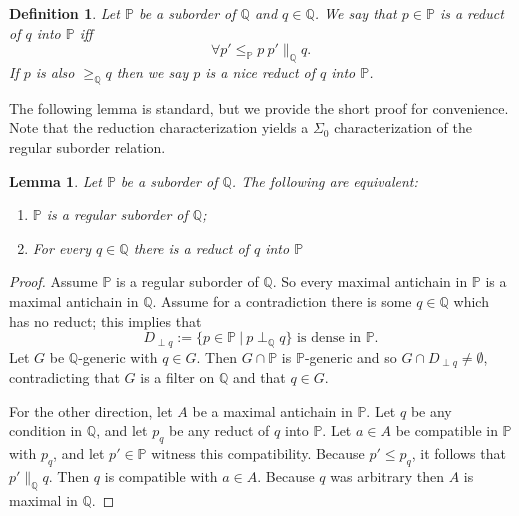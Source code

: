 \documentclass{amsart}
\newtheorem{definition}[theorem]{Definition}
\newtheorem{lemma}[theorem]{Lemma}
\begin{document}
\begin{definition}
Let $\mathbb{P}$ be a suborder of $\mathbb{Q}$ and $q \in \mathbb{Q}$.  We say that $p \in \mathbb{P}$ is a \emph{reduct of $q$ into $\mathbb{P}$} iff   
\begin{equation*}
  \forall p' \le_{\mathbb{P}} p \ p' \parallel_{\mathbb{Q}} q.
\end{equation*}
If $p$ is also $\ge_{\mathbb{Q}} q$ then we say $p$ is a \emph{nice} reduct of $q$ into $\mathbb{P}$.
\end{definition}

The following lemma is standard, but we provide the short proof for convenience.  Note that the reduction characterization yields a $\Sigma_0$ characterization of the regular suborder relation.
\begin{lemma}\label{lem_ReductCharactOfReg}
Let $\mathbb{P}$ be a suborder of $\mathbb{Q}$.  The following are equivalent:
\begin{enumerate}
  \item $\mathbb{P}$ is a regular suborder of $\mathbb{Q}$;
  \item For every $q \in \mathbb{Q}$ there is a reduct of $q$ into $\mathbb{P}$
\end{enumerate}
\end{lemma}
\begin{proof}
Assume $\mathbb{P}$ is a regular suborder of $\mathbb{Q}$.  So every maximal antichain in $\mathbb{P}$ is a maximal antichain in $\mathbb{Q}$.  Assume for a contradiction there is some $q \in \mathbb{Q}$ which has no reduct; this implies that
\begin{equation*}
D_{\perp q}:= \{ p \in \mathbb{P} \ | \  p \perp_{\mathbb{Q}} q \} \text{ is dense in } \mathbb{P}.
\end{equation*}
Let $G$ be $\mathbb{Q}$-generic with $q \in G$.  Then $G \cap \mathbb{P}$ is $\mathbb{P}$-generic and so $G \cap D_{\perp q} \ne \emptyset$, contradicting that $G$ is a filter on $\mathbb{Q}$ and that $q \in G$.

For the other direction, let $A$ be a maximal antichain in $\mathbb{P}$.  Let $q$ be any condition in $\mathbb{Q}$, and let $p_q$ be any reduct of $q$ into $\mathbb{P}$.  Let $a \in A$ be compatible in $\mathbb{P}$ with $p_q$, and let $p' \in \mathbb{P}$ witness this compatibility.  Because $p' \le p_q$, it follows that $p' \parallel_{\mathbb{Q}} q$.  Then $q$ is compatible with $a \in A$.  Because $q$ was arbitrary then $A$ is maximal in $\mathbb{Q}$.
\end{proof}
\end{document}
